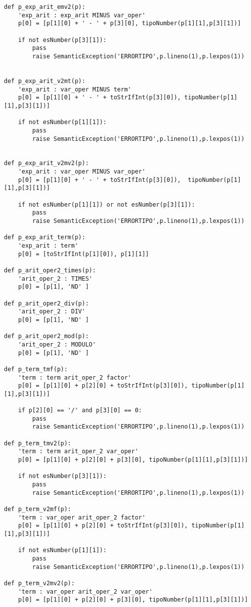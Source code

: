 \begin{verbatim}
def p_exp_arit_emv2(p):
    'exp_arit : exp_arit MINUS var_oper'
    p[0] = [p[1][0] + ' - ' + p[3][0], tipoNumber(p[1][1],p[3][1])]

    if not esNumber(p[3][1]):
        pass
        raise SemanticException('ERRORTIPO',p.lineno(1),p.lexpos(1))


def p_exp_arit_v2mt(p):
    'exp_arit : var_oper MINUS term'
    p[0] = [p[1][0] + ' - ' + toStrIfInt(p[3][0]), tipoNumber(p[1][1],p[3][1])]

    if not esNumber(p[1][1]):
        pass
        raise SemanticException('ERRORTIPO',p.lineno(1),p.lexpos(1))


def p_exp_arit_v2mv2(p):
    'exp_arit : var_oper MINUS var_oper'
    p[0] = [p[1][0] + ' - ' + toStrIfInt(p[3][0]),  tipoNumber(p[1][1],p[3][1])]

    if not esNumber(p[1][1]) or not esNumber(p[3][1]):
        pass
        raise SemanticException('ERRORTIPO',p.lineno(1),p.lexpos(1))

def p_exp_arit_term(p):
    'exp_arit : term'
    p[0] = [toStrIfInt(p[1][0]), p[1][1]]

def p_arit_oper2_times(p):
    'arit_oper_2 : TIMES'
    p[0] = [p[1], 'ND' ]

def p_arit_oper2_div(p):
    'arit_oper_2 : DIV'
    p[0] = [p[1], 'ND' ]

def p_arit_oper2_mod(p):
    'arit_oper_2 : MODULO'
    p[0] = [p[1], 'ND' ]

def p_term_tmf(p):
    'term : term arit_oper_2 factor'
    p[0] = [p[1][0] + p[2][0] + toStrIfInt(p[3][0]), tipoNumber(p[1][1],p[3][1])]

    if p[2][0] == '/' and p[3][0] == 0:
        pass
        raise SemanticException('ERRORTIPO',p.lineno(1),p.lexpos(1))

def p_term_tmv2(p):
    'term : term arit_oper_2 var_oper'
    p[0] = [p[1][0] + p[2][0] + p[3][0], tipoNumber(p[1][1],p[3][1])]

    if not esNumber(p[3][1]):
        pass
        raise SemanticException('ERRORTIPO',p.lineno(1),p.lexpos(1))

def p_term_v2mf(p):
    'term : var_oper arit_oper_2 factor'
    p[0] = [p[1][0] + p[2][0] + toStrIfInt(p[3][0]), tipoNumber(p[1][1],p[3][1])]

    if not esNumber(p[1][1]):
        pass
        raise SemanticException('ERRORTIPO',p.lineno(1),p.lexpos(1))

def p_term_v2mv2(p):
    'term : var_oper arit_oper_2 var_oper'
    p[0] = [p[1][0] + p[2][0] + p[3][0], tipoNumber(p[1][1],p[3][1])]


\end{verbatim}
